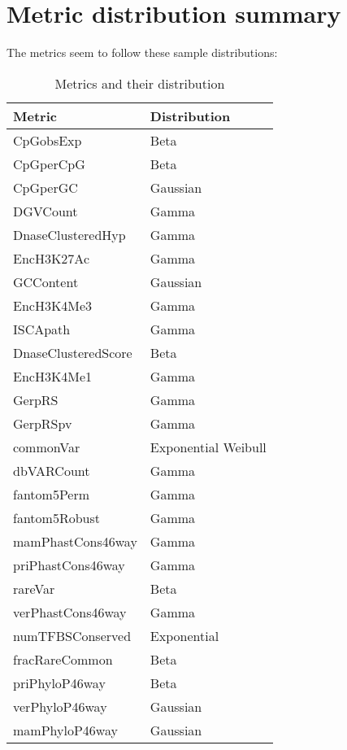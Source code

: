 \documentclass[\main/main.tex]{subfiles}
\begin{document}
\chapter{Metric distribution summary}
The metrics seem to follow these sample distributions:

\begin{table}
  \begin{tabular}{|l|l|}
    \hline
    \textbf{Metric}     & \textbf{Distribution} \\
    \hline
    CpGobsExp           & Beta                  \\
    \hline
    CpGperCpG           & Beta                  \\
    \hline
    CpGperGC            & Gaussian              \\
    \hline
    DGVCount            & Gamma                 \\
    \hline
    DnaseClusteredHyp   & Gamma                 \\
    \hline
    EncH3K27Ac          & Gamma                 \\
    \hline
    GCContent           & Gaussian              \\
    \hline
    EncH3K4Me3          & Gamma                 \\
    \hline
    ISCApath            & Gamma                 \\
    \hline
    DnaseClusteredScore & Beta                  \\
    \hline
    EncH3K4Me1          & Gamma                 \\
    \hline
    GerpRS              & Gamma                 \\
    \hline
    GerpRSpv            & Gamma                 \\
    \hline
    commonVar           & Exponential Weibull   \\
    \hline
    dbVARCount          & Gamma                 \\
    \hline
    fantom5Perm         & Gamma                 \\
    \hline
    fantom5Robust       & Gamma                 \\
    \hline
    mamPhastCons46way   & Gamma                 \\
    \hline
    priPhastCons46way   & Gamma                 \\
    \hline
    rareVar             & Beta                  \\
    \hline
    verPhastCons46way   & Gamma                 \\
    \hline
    numTFBSConserved    & Exponential           \\
    \hline
    fracRareCommon      & Beta                  \\
    \hline
    priPhyloP46way      & Beta                  \\
    \hline
    verPhyloP46way      & Gaussian              \\
    \hline
    mamPhyloP46way      & Gaussian              \\
    \hline
  \end{tabular}
  \caption{Metrics and their distribution}
\end{table}
\end{document}

